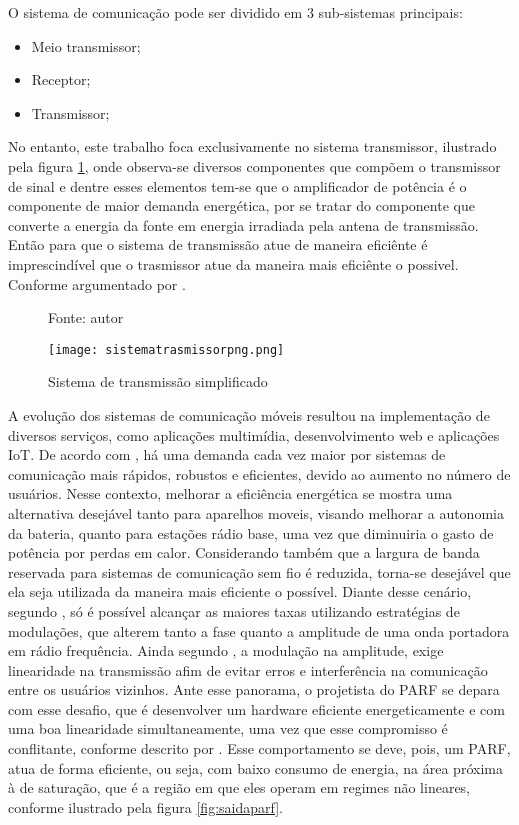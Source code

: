 O sistema de comunicação pode ser dividido em 3 sub-sistemas principais:
\begin{itemize}
    \item Meio transmissor;
    \item Receptor;
    \item Transmissor;
\end{itemize}

No entanto, este trabalho foca exclusivamente no sistema transmissor, ilustrado pela figura \ref{fig:sistemadetrasmissao}, onde observa-se diversos componentes que compõem o transmissor de sinal e dentre esses elementos tem-se que o amplificador de potência é o componente de maior demanda energética, por se tratar do componente que converte a energia da fonte em energia irradiada pela antena de transmissão. Então para que o sistema de transmissão atue de maneira eficiênte é imprescindível que o trasmissor atue da maneira mais eficiênte o possivel. Conforme argumentado por \cite{Schuartz2017}.

\begin{figure}[ht!]
    \centering
    \captionsetup{justification=centering}
    \caption*{Fonte: autor}
    \texttt{[image: sistematrasmissorpng.png]}
    \caption{Sistema de transmissão simpliﬁcado}
    \label{fig:sistemadetrasmissao}
\end{figure}

A evolução dos sistemas de comunicação móveis resultou na implementação de diversos serviços, como aplicações multimídia, desenvolvimento web e aplicações IoT. De acordo com \cite{John2016}, há uma demanda cada vez maior por sistemas de comunicação mais rápidos, robustos e eficientes, devido ao aumento no número de usuários.  Nesse contexto, melhorar a eficiência energética se mostra uma alternativa desejável tanto para aparelhos moveis, visando melhorar a autonomia da bateria, quanto para estações rádio base, uma vez que diminuiria o gasto de potência por perdas em calor. Considerando também que a largura de banda reservada para sistemas de comunicação sem fio é reduzida, torna-se desejável que ela seja utilizada da maneira mais eficiente o possível. Diante desse cenário, segundo \cite{Kenington2000}, só é possível alcançar as maiores taxas utilizando estratégias de modulações, que alterem tanto a fase quanto a amplitude de uma onda portadora em rádio frequência. Ainda segundo \cite{Kenington2000}, a modulação na amplitude, exige linearidade na transmissão afim de evitar erros e interferência na comunicação entre os usuários vizinhos. Ante esse panorama, o projetista do PARF se depara com esse desafio, que é desenvolver um hardware eficiente energeticamente e com uma boa linearidade simultaneamente, uma vez que esse compromisso é conflitante, conforme descrito por \cite{Cripps2006}. Esse comportamento se deve, pois, um PARF, atua de forma eficiente, ou seja, com baixo consumo de energia, na área próxima à de saturação, que é a região em que eles operam em regimes não lineares, conforme ilustrado pela figura \ref{fig:saidaparf}.

